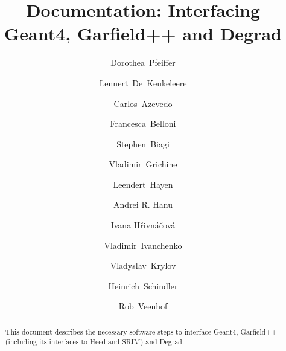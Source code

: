 \documentclass[preprint,12pt,sort&compress]{elsarticle}
\begin{document}
\begin{frontmatter}



\title{Documentation: Interfacing Geant4, Garfield++ and Degrad}


\author[add1,add2]{Dorothea~Pfeiffer}
\author[add3]{Lennert~De~Keukeleere}
\author[add4]{Carlos~Azevedo}
\author[add5]{Francesca~Belloni}
\author[add6]{Stephen~Biagi}
\author[add7]{Vladimir~Grichine}
\author[add3]{Leendert~Hayen}
\author[add8]{Andrei R. Hanu}
\author[add9]{Ivana H\v{r}ivn\'{a}\v{c}ov\'{a}}
\author[add2,add10]{Vladimir~Ivanchenko}
\author[add11,add12]{Vladyslav~Krylov}
\author[add2]{Heinrich~Schindler}
\author[add2,add13]{Rob~Veenhof}


\address[add1]{European Spallation Source (ESS AB),P.O. Box 176, SE-22100 Lund, Sweden}%
\address[add2]{CERN, CH-1211 Geneva 23, Switzerland}%
\address[add3]{Instituut voor Kern- en Stralingsfysica, KU Leuven, Belgium}%
\address[add4]{I3N - Physics Department, University of Aveiro, 3810-193 Aveiro, Portugal}%
\address[add5]{CEA Saclay, 91191 Gif-sur-Yvette, France}%
\address[add6]{Department of Physics, University of Liverpool, UK}%
\address[add7]{Lebedev Physical Institute of RAS, Moscow, Russia}%
\address[add8]{NASA Goddard Space Flight Center, Greenbelt, Maryland 20771, USA}%
\address[add9]{Institut de Physique Nucl\'{e}aire, Universit\'{e} Paris-Sud, CNRS-IN2P3, Orsay, France}%
\address[add10]{Tomsk State University, Tomsk, Russia}%
\address[add11]{Laboratoire de l'Acc\'{e}l\'{e}rateur Lin\'{e}aire (LAL), Universit\'{e} Paris-Sud XI, CNRS/IN2P3, 91898 Orsay, France}%
\address[add12]{Taras Shevchenko National University of Kyiv (TSNUK), Kyiv, Ukraine}%
\address[add13]{Uludag University, 16059 N{\"u}lufer-Bursa, Turkey}%



\begin{abstract}
This document describes the necessary software steps to interface Geant4, Garfield++ (including its interfaces to Heed and SRIM) and Degrad. 
\end{abstract}

\end{frontmatter}
\end{document}
